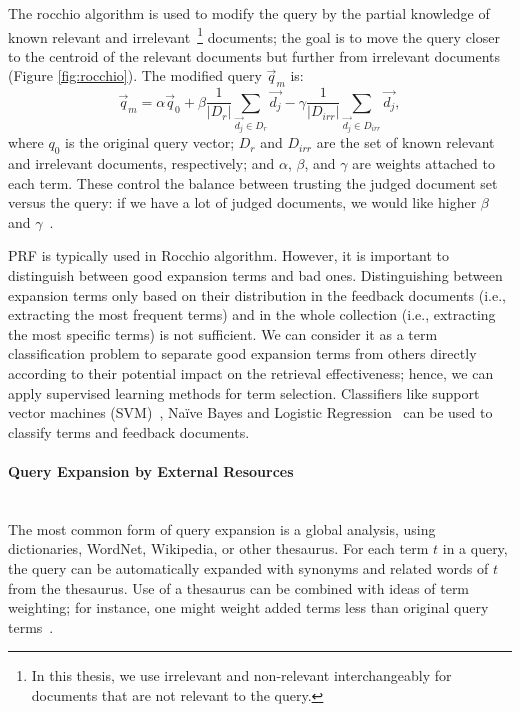 The rocchio algorithm is used to modify the query by the partial knowledge of known relevant and irrelevant~\footnote{In this thesis, we use irrelevant and non-relevant interchangeably for documents that are not relevant to the query.} documents; the goal is to move the query closer to the centroid of the relevant documents but further from irrelevant documents (Figure \ref{fig:rocchio}). The modified query $ \vec{q}_m $ is:
\begin{equation}
\label{eq:rocchio}
 \vec{q}_{m} = \alpha  \vec{q}_{0} + \beta\frac{1}{|D_{r}|}\sum\limits_{\vec{d_{j}}\in D_{r}} \vec{d_{j}} - \gamma\frac{1}{|D_{irr}|}\sum\limits_{\vec{d_{j}}\in D_{irr}} \vec{d_{j}},
  \end{equation}
where $ q_{0} $ is the original query vector; $ D_{r} $ and $ D_{irr} $ are the set of known relevant and irrelevant documents, respectively; and $ \alpha $, $ \beta $, and $ \gamma $ are weights attached to each term. These control the balance between trusting the judged document set versus the query: if we have a lot of judged documents, we
would like higher $ \beta $ and $ \gamma $~\citep{manning2008introduction}. 

PRF is typically used in Rocchio algorithm. However, it is important to distinguish between good expansion terms and bad ones. Distinguishing between expansion terms only based on their distribution in the feedback documents (i.e., extracting the most frequent terms) and in the whole collection (i.e., extracting the most specific terms) is not sufficient. We can consider it as a term classification problem to separate good expansion terms from others directly according to their potential impact on the retrieval effectiveness; hence, we can apply supervised learning methods for term selection. Classifiers like support vector machines (SVM)~\citep{cao2008selecting}, Na\"ive Bayes and Logistic Regression~\citep{he2009finding} can be used to classify terms and feedback documents.  
\paragraph{Query Expansion by External Resources}
\ \\
The most common form of query expansion is a global analysis, using dictionaries, WordNet, Wikipedia, or other thesaurus. For each term $ t $ in a query, the query can be automatically expanded with synonyms and related words of $ t $ from the thesaurus. Use of a thesaurus can be combined with ideas of term weighting; for instance, one might weight added terms less than original query terms~\citep{manning2008introduction}.